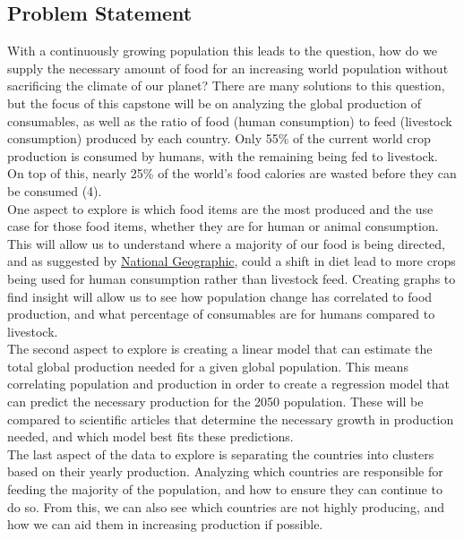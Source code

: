 \documentclass[12pt, a4paper]{article}
\begin{document}
\begin{spacing}{1.1}
	\subsection{Problem Statement}
	With a continuously growing population this leads to the question, how do we supply the necessary amount of food for an increasing world population without sacrificing the climate of our planet? There are many solutions to this question, but the focus of this capstone will be on analyzing the global production of consumables, as well as the ratio of food (human consumption) to feed (livestock consumption) produced by each country. Only 55\% of the current world crop production is consumed by humans, with the remaining being fed to livestock. On top of this, nearly 25\% of the world's food calories are wasted before they can be consumed (4).\vspace*{2mm}\\	
	One aspect to explore is which food items are the most produced and the use case for those food items, whether they are for human or animal consumption. This will allow us to understand where a majority of our food is being directed, and as suggested by \href{https://www.nationalgeographic.com/foodfeatures/feeding-9-billion/}{National Geographic}, could a shift in diet lead to more crops being used for human consumption rather than livestock feed. Creating graphs to find insight will allow us to see how population change has correlated to food production, and what percentage of consumables are for humans compared to livestock. \vspace*{2mm}\\	
	The second aspect to explore is creating a linear model that can estimate the total global production needed for a given global population. This means correlating population and production in order to create a regression model that can predict the necessary production for the 2050 population. These will be compared to scientific articles that determine the necessary growth in production needed, and which model best fits these predictions.\vspace*{2mm}\\
	The last aspect of the data to explore is separating the countries into clusters based on their yearly production. Analyzing which countries are responsible for feeding the majority of the population, and how to ensure they can continue to do so. From this, we can also see which countries are not highly producing, and how we can aid them in increasing production if possible. \newpage


\end{spacing}
\end{document}
